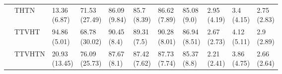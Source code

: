 \begin{table}
\begin{tabular}{lllllllllll}
       & THTN &   \makecell{13.36\\(6.87)} &  \makecell{71.53\\(27.49)} &   \makecell{86.09\\(9.84)} &   \makecell{85.7\\(8.39)} &  \makecell{86.62\\(7.89)} &    \makecell{85.08\\(9.0)} &      \makecell{2.95\\(4.19)} &   \makecell{3.4\\(4.15)} &  \makecell{2.75\\(2.83)} \\
       & TTVHT &   \makecell{94.86\\(5.01)} &  \makecell{68.78\\(30.02)} &    \makecell{90.45\\(8.4)} &   \makecell{89.31\\(7.5)} &  \makecell{90.28\\(8.01)} &   \makecell{86.94\\(8.51)} &      \makecell{2.67\\(2.73)} &  \makecell{4.12\\(5.11)} &   \makecell{2.9\\(2.89)} \\
       & TTVHTN &  \makecell{20.93\\(13.45)} &  \makecell{76.09\\(25.73)} &    \makecell{87.67\\(8.1)} &  \makecell{87.42\\(7.62)} &  \makecell{87.73\\(7.74)} &    \makecell{85.37\\(8.8)} &      \makecell{2.21\\(2.41)} &  \makecell{3.86\\(4.75)} &  \makecell{2.66\\(2.64)} \\
\bottomrule
\end{tabular}
\end{table}
